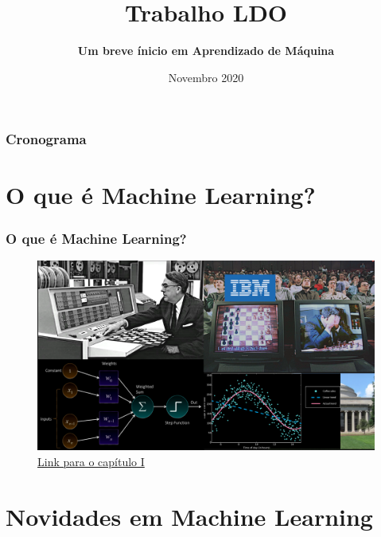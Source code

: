 \documentclass{beamer}
\title[LDO] %
{\textbf{Trabalho LDO}}
\subtitle{\textbf{Um breve ínicio em Aprendizado de Máquina}}
\institute[PUC] %
{
  \inst{1}%
  \emph{Pontifícia Universidade Católica de Minas Gerais}
  \\PUC-MG
}
\date[2020] %
{Novembro 2020}
\begin{document}
\frame{\titlepage}


\begin{frame}
    \frametitle{Cronograma}
    \tableofcontents
\end{frame}

\section{O que é Machine Learning?}

\begin{frame}
 
    \frametitle{O que é Machine Learning?}
    \begin{figure}[ht]
        \centering
        \includegraphics[scale=0.5]{Capitulo1.png}
        \caption{\href{run:./capitulos/Capitulo_01/Capitulo01.pdf}{Link para o capítulo I}}
    \end{figure}

\end{frame}

\section{Novidades em Machine Learning}
\end{document}
